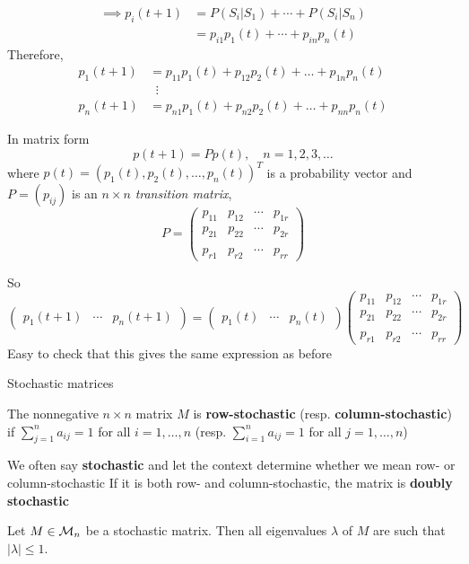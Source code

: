 \documentclass[aspectratio=169]{beamer}\usepackage[]{graphicx}\usepackage[]{xcolor}
\begin{document}
\begin{frame}
\begin{align*}
\implies
p_i(t+1) &= P(S_i|S_1)+\cdots+P(S_i|S_n) \\
&= p_{i1}p_1(t)+\cdots+p_{in}p_n(t)
\end{align*}
Therefore,
\begin{align*}
p_1(t+1) &= p_{11}p_1(t)+p_{12}p_2(t)+\dots+p_{1n}p_n(t) \\
& \;\;\vdots\\
p_n(t+1) &= p_{n1}p_1(t)+p_{n2}p_2(t)+\dots+p_{nn}p_n(t)
\end{align*}
\end{frame}

\begin{frame}
In matrix form
\[
p(t+1)=Pp(t), \quad n=1,2,3,\dots
\]
where $p(t)=(p_1(t),p_{2}(t),\dots , p_n(t))^T$ is a probability vector and $P=(p_{ij})$ is an $n\times n$ \emph{transition matrix},
\[
P=
\begin{pmatrix}
p_{11} & p_{12} & \cdots & p_{1r} \\
p_{21} & p_{22} & \cdots & p_{2r} \\
&&& \\
p_{r1} & p_{r2} & \cdots & p_{rr}
\end{pmatrix}
\]
\end{frame}


\begin{frame}
So
\[
\begin{pmatrix}
	p_1(t+1) & \cdots & p_n(t+1)
\end{pmatrix}
=
\begin{pmatrix}
	p_1(t) & \cdots & p_n(t)
\end{pmatrix}
\begin{pmatrix}
p_{11} & p_{12} & \cdots & p_{1r} \\
p_{21} & p_{22} & \cdots & p_{2r} \\
&&& \\
p_{r1} & p_{r2} & \cdots & p_{rr}
\end{pmatrix}
\]
\vfill
Easy to check that this gives the same expression as before
\end{frame}



\begin{frame}{Stochastic matrices}
\begin{definition}
The nonnegative $n\times n$ matrix $M$ is \textbf{row-stochastic} (resp. \textbf{column-stochastic}) if $\sum_{j=1}^na_{ij}=1$ for all $i=1,\dots,n$ (resp. $\sum_{i=1}^na_{ij}=1$ for all $j=1,\dots,n$)
\end{definition}
\vfill
We often say \textbf{stochastic} and let the context determine whether we mean row- or column-stochastic
\vfill
If it is both row- and column-stochastic, the matrix is \textbf{doubly stochastic}
\vfill
\begin{theorem}\label{th:spectrum_stochastic_matrix}
Let $M\in\mathcal{M}_n$ be a stochastic matrix. Then all eigenvalues $\lambda$ of $M$ are such that $|\lambda|\leq 1$.
\end{theorem}
\end{frame}
\end{document}

